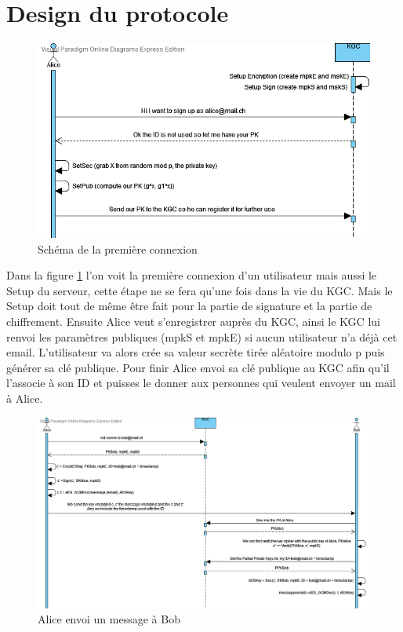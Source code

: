 \section{Design du protocole}
\begin{figure}[h!]
	\centering
	\includegraphics[width=14cm]{images/firstConnexion.png}
	\caption{Schéma de la première connexion}
	\label{fig:firstConn}
\end{figure}
Dans la figure \ref{fig:firstConn} l'on voit la première connexion d'un utilisateur mais aussi le Setup du serveur, cette étape ne se fera qu'une fois dans la vie du KGC. Mais le Setup doit tout de même être fait pour la partie de signature et la partie de chiffrement.
Ensuite Alice veut s'enregistrer auprès du KGC, ainsi le KGC lui renvoi les paramètres publiques (mpkS et mpkE) si aucun utilisateur n'a déjà cet email.
L'utilisateur va alors crée sa valeur secrète tirée aléatoire modulo p puis générer sa clé publique.
Pour finir Alice envoi sa clé publique au KGC afin qu'il l'associe à son ID et puisses le donner aux personnes qui veulent envoyer un mail à Alice.\\

\begin{figure}[h!]
	\centering
	\includegraphics[width=14cm]{images/aliceSendsToBob.png}
	\caption{Alice envoi un message à Bob}
	\label{fig:aliceSends}
\end{figure}

